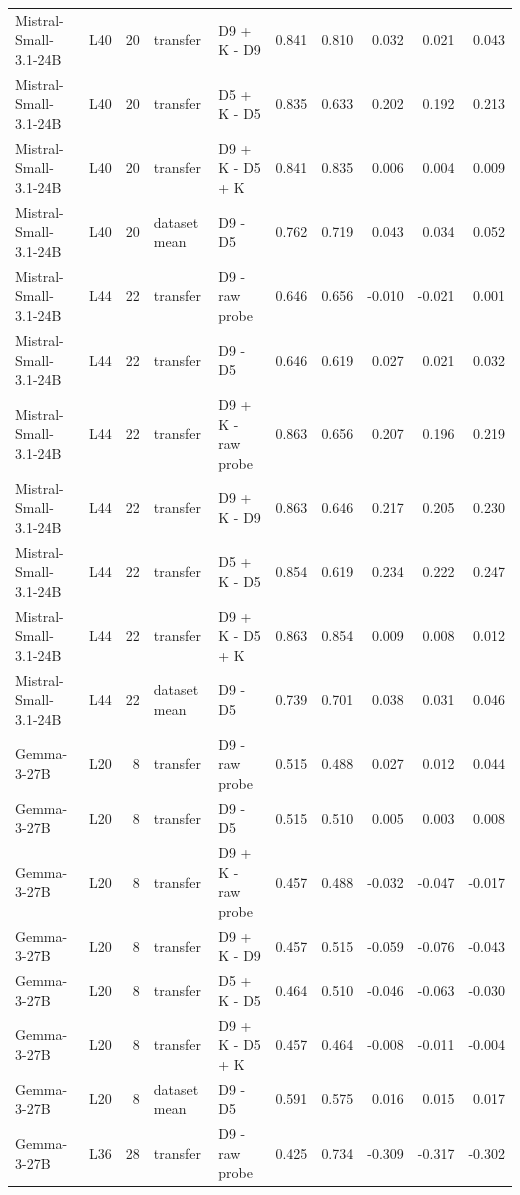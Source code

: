 \begin{table}
{\begin{tabular}{llrllrrrrr}
Mistral-Small-3.1-24B & L40 & 20 & transfer & D9 + K - D9 & 0.841 & 0.810 & 0.032 & 0.021 & 0.043 \\
Mistral-Small-3.1-24B & L40 & 20 & transfer & D5 + K - D5 & 0.835 & 0.633 & 0.202 & 0.192 & 0.213 \\
Mistral-Small-3.1-24B & L40 & 20 & transfer & D9 + K - D5 + K & 0.841 & 0.835 & 0.006 & 0.004 & 0.009 \\
Mistral-Small-3.1-24B & L40 & 20 & dataset mean & D9 - D5 & 0.762 & 0.719 & 0.043 & 0.034 & 0.052 \\
Mistral-Small-3.1-24B & L44 & 22 & transfer & D9 - raw probe & 0.646 & 0.656 & -0.010 & -0.021 & 0.001 \\
Mistral-Small-3.1-24B & L44 & 22 & transfer & D9 - D5 & 0.646 & 0.619 & 0.027 & 0.021 & 0.032 \\
Mistral-Small-3.1-24B & L44 & 22 & transfer & D9 + K - raw probe & 0.863 & 0.656 & 0.207 & 0.196 & 0.219 \\
Mistral-Small-3.1-24B & L44 & 22 & transfer & D9 + K - D9 & 0.863 & 0.646 & 0.217 & 0.205 & 0.230 \\
Mistral-Small-3.1-24B & L44 & 22 & transfer & D5 + K - D5 & 0.854 & 0.619 & 0.234 & 0.222 & 0.247 \\
Mistral-Small-3.1-24B & L44 & 22 & transfer & D9 + K - D5 + K & 0.863 & 0.854 & 0.009 & 0.008 & 0.012 \\
Mistral-Small-3.1-24B & L44 & 22 & dataset mean & D9 - D5 & 0.739 & 0.701 & 0.038 & 0.031 & 0.046 \\
Gemma-3-27B & L20 & 8 & transfer & D9 - raw probe & 0.515 & 0.488 & 0.027 & 0.012 & 0.044 \\
Gemma-3-27B & L20 & 8 & transfer & D9 - D5 & 0.515 & 0.510 & 0.005 & 0.003 & 0.008 \\
Gemma-3-27B & L20 & 8 & transfer & D9 + K - raw probe & 0.457 & 0.488 & -0.032 & -0.047 & -0.017 \\
Gemma-3-27B & L20 & 8 & transfer & D9 + K - D9 & 0.457 & 0.515 & -0.059 & -0.076 & -0.043 \\
Gemma-3-27B & L20 & 8 & transfer & D5 + K - D5 & 0.464 & 0.510 & -0.046 & -0.063 & -0.030 \\
Gemma-3-27B & L20 & 8 & transfer & D9 + K - D5 + K & 0.457 & 0.464 & -0.008 & -0.011 & -0.004 \\
Gemma-3-27B & L20 & 8 & dataset mean & D9 - D5 & 0.591 & 0.575 & 0.016 & 0.015 & 0.017 \\
Gemma-3-27B & L36 & 28 & transfer & D9 - raw probe & 0.425 & 0.734 & -0.309 & -0.317 & -0.302 \\

\end{tabular}}
\end{table}
